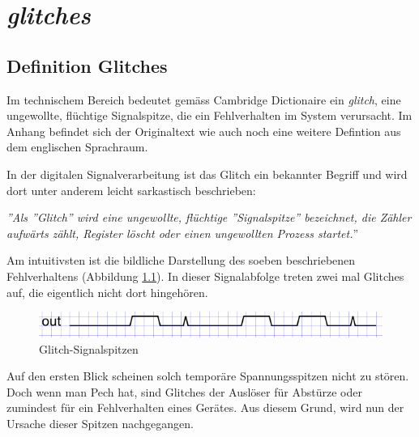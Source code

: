 
\chapter{\textit{glitches}}\label{chap.glitch}

\section{Definition Glitches}\label{sect.glitch_def}

Im technischem Bereich bedeutet gemäss Cambridge Dictionaire ein \textit{glitch}, eine ungewollte, flüchtige Signalspitze, die ein Fehlverhalten im System verursacht. Im Anhang  befindet sich der Originaltext wie auch noch eine weitere Defintion aus dem englischen Sprachraum.

In der digitalen Signalverarbeitung ist das Glitch ein bekannter Begriff und wird dort unter anderem leicht sarkastisch beschrieben:

\textit{''Als ''Glitch''  wird eine ungewollte, flüchtige ''Signalspitze'' bezeichnet, die Zähler aufwärts zählt, Register löscht oder einen ungewollten Prozess startet.}'' 
\cite{F_glitches}


Am intuitivsten ist die bildliche Darstellung des soeben beschriebenen Fehlverhaltens (Abbildung \ref{fig.glitch.def}). In dieser Signalabfolge treten zwei mal Glitches auf, die eigentlich nicht dort hingehören.\\
\begin{figure}[H]
	\centering
	\includegraphics[width=\textwidth]{images/glitch/def_glitch_1.png}
	\caption{Glitch-Signalspitzen}
	\label{fig.glitch.def}
\end{figure}

Auf den ersten Blick scheinen solch temporäre Spannungsspitzen nicht zu stören. Doch wenn man Pech hat, sind Glitches der Auslöser für Abstürze oder zumindest für ein Fehlverhalten eines Gerätes. Aus diesem Grund, wird nun der Ursache dieser Spitzen nachgegangen.\\ 



